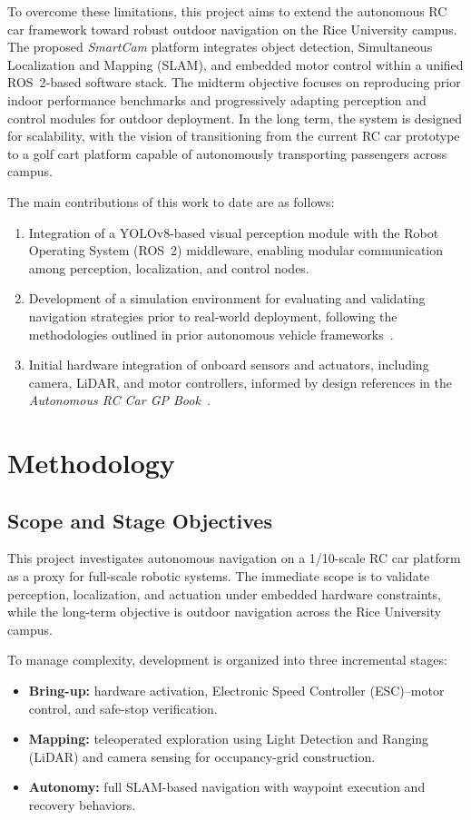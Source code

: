 \documentclass[journal,transmag]{IEEEtran}
\begin{document}
To overcome these limitations, this project aims to extend the autonomous RC car framework toward robust outdoor navigation on the Rice University campus. The proposed \textit{SmartCam} platform integrates object detection, Simultaneous Localization and Mapping (SLAM), and embedded motor control within a unified ROS~2-based software stack. The midterm objective focuses on reproducing prior indoor performance benchmarks and progressively adapting perception and control modules for outdoor deployment. In the long term, the system is designed for scalability, with the vision of transitioning from the current RC car prototype to a golf cart platform capable of autonomously transporting passengers across campus.

The main contributions of this work to date are as follows:
\begin{enumerate}
    \item Integration of a YOLOv8-based visual perception module with the Robot Operating System (ROS~2) middleware, enabling modular communication among perception, localization, and control nodes.
    \item Development of a simulation environment for evaluating and validating navigation strategies prior to real-world deployment, following the methodologies outlined in prior autonomous vehicle frameworks~\cite{pmlr}.
    \item Initial hardware integration of onboard sensors and actuators, including camera, LiDAR, and motor controllers, informed by design references in the \textit{Autonomous RC Car GP Book}~\cite{smartcam_book}.
\end{enumerate}

\section{Methodology}

\subsection{Scope and Stage Objectives}
This project investigates autonomous navigation on a 1/10-scale RC car platform as a proxy for full-scale robotic systems. The immediate scope is to validate perception, localization, and actuation under embedded hardware constraints, while the long-term objective is outdoor navigation across the Rice University campus.

To manage complexity, development is organized into three incremental stages:
\begin{itemize}
    \item \textbf{Bring-up:} hardware activation, Electronic Speed Controller (ESC)–motor control, and safe-stop verification.
    \item \textbf{Mapping:} teleoperated exploration using Light Detection and Ranging (LiDAR) and camera sensing for occupancy-grid construction.
    \item \textbf{Autonomy:} full SLAM-based navigation with waypoint execution and recovery behaviors.
\end{itemize}
\end{document}
